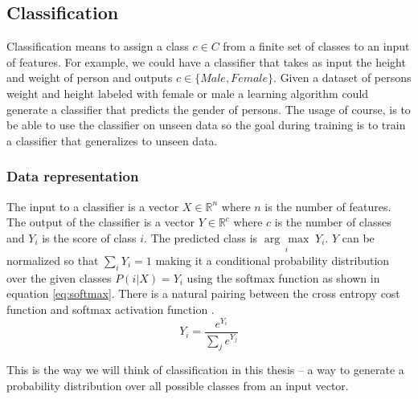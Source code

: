 \documentclass{kththesis}
\begin{document}
\subsection{Classification}
Classification means to assign a class $c \in C$ from a finite set  of classes to an input of features. For example, we could have a classifier that takes as input  the height and weight of person and outputs $c \in \{Male, Female\}$. Given a dataset of persons weight and height  labeled with female or male  a  learning algorithm could generate a classifier that predicts the gender of persons.  The usage of course, is to be able to use the classifier on unseen data so the goal during training is to train a classifier that generalizes to unseen data.

\newcommand{\argmax}[1]{\underset{#1}{\operatorname{arg}\,\operatorname{max}}\;}
\subsubsection{Data representation}
\label{sec:machine_learning:data_representation}
The input to a classifier is a vector $X \in \mathbb{R}^{n}$ where $n$ is the  number of features.
The output of the classifier is a vector $Y \in \mathbb{R}^{c}$ where $c$ is the number of classes and $Y_{i}$ is the score of class $i$. The predicted class is $\argmax{i}Y_{i}$. $Y$ can be normalized so that $\sum_{i}Y_{i}=1$ making it a conditional probability distribution over the given classes $P(i|X)=Y_i$ using the softmax function as shown in equation \ref{eq:softmax}. There  is a natural pairing between the cross entropy cost function and softmax activation function \cite{dunne1997pairing}.
\begin{equation}
\label{eq:softmax}
Y_i=\frac{e^{Y_i}}{\sum_j{e^{Y_j}}}
\end{equation}

This is the way we will think of classification in this thesis – a way to generate a probability distribution over all possible classes from an input vector.
\end{document}
